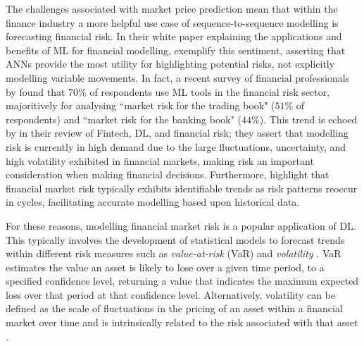 \documentclass[a4paper, 11pt]{report}
\begin{document}
    The challenges associated with market price prediction mean that within the finance industry a more helpful use case of sequence-to-sequence modelling is forecasting financial risk. In their white paper explaining the applications and benefits of ML for financial modelling, \citet{laplante-2019} exemplify this sentiment, asserting that ANNs provide the most utility for highlighting potential risks, not explicitly modelling variable movements. In fact, a recent survey of financial professionals by \citet{chartis-2019} found that $70\%$ of respondents use ML tools in the financial risk sector, majoritively for analysing ``market risk for the trading book" ($51\%$ of respondents) and ``market risk for the banking book" ($44\%$). This trend is echoed by \citet{peng-2021} in their review of Fintech, DL, and financial risk; they assert that modelling risk is currently in high demand due to the large fluctuations, uncertainty, and high volatility exhibited in financial markets, making risk an important consideration when making financial decisions. Furthermore, \citet{mashrur-2020} highlight that financial market risk typically exhibits identifiable trends as risk patterns reoccur in cycles, facilitating accurate modelling based upon historical data.

    For these reasons, modelling financial market risk is a popular application of DL. This typically involves the development of statistical models to forecast trends within different risk measures such as \emph{value-at-risk} (VaR) and \emph{volatility} \citep{peng-2021}. VaR estimates the value an asset is likely to lose over a given time period, to a specified confidence level, returning a value that indicates the maximum expected loss over that period at that confidence level. Alternatively, volatility can be defined as the scale of fluctuations in the pricing of an asset within a financial market over time and is intrinsically related to the risk associated with that asset \citep{cavalcante-2016}.
    
\end{document}
